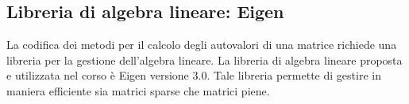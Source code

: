 \subsection*{Libreria di algebra lineare: Eigen}

La codifica dei metodi per il calcolo degli autovalori di una matrice
richiede una libreria per la gestione dell'algebra
lineare. La libreria di algebra lineare proposta e utilizzata
nel corso \`e Eigen versione 3.0.
Tale libreria permette di gestire in maniera efficiente sia
matrici sparse che matrici piene.
